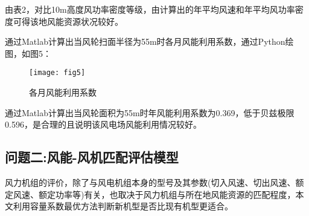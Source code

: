 \documentclass[withoutpreface,bwprint]{cumcmthesis} %
\begin{document}
		由表2，对比10m高度风功率密度等级，由计算出的年平均风速和年平均风功率密度可得该地风能资源状况较好。\par
		通过Matlab计算出当风轮扫面半径为55m时各月风能利用系数，通过Python绘图，如图5：
		\begin{figure}[!h]
			\centering
			\texttt{[image: fig5]}
			\caption{各月风能利用系数}
			\label{fig:liyong}
		\end{figure}\par		
		通过Matlab计算出当风轮面积为55m时年风能利用系数为0.369，低于贝兹极限0.596，是合理的且说明该风电场风能利用情况较好。
		\subsection{问题二:风能-风机匹配评估模型}
		风力机组的评价，除了与风电机组本身的型号及其参数(切入风速、切出风速、额定风速、额定功率等)有关，也取决于风力机组与所在地风能资源的匹配程度，本文利用容量系数最优方法判断新机型是否比现有机型更适合。
\end{document}
